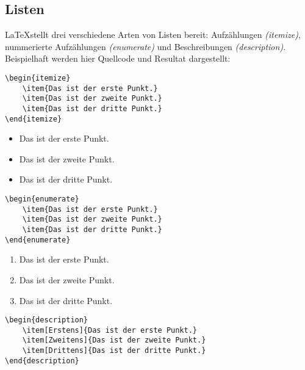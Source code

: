 \subsection{Listen}

\LaTeX stellt drei verschiedene Arten von Listen bereit: Aufzählungen \textit{(itemize)}, nummerierte Aufzählungen \textit{(enumerate)} und Beschreibungen \textit{(description)}.
Beispielhaft werden hier Quellcode und Resultat dargestellt:


\begin{verbatim}
\begin{itemize}
    \item{Das ist der erste Punkt.}
    \item{Das ist der zweite Punkt.}
    \item{Das ist der dritte Punkt.}
\end{itemize}
\end{verbatim}

\begin{itemize}
    \item{Das ist der erste Punkt.}
    \item{Das ist der zweite Punkt.}
    \item{Das ist der dritte Punkt.}
\end{itemize}


\begin{verbatim}
\begin{enumerate}
    \item{Das ist der erste Punkt.}
    \item{Das ist der zweite Punkt.}
    \item{Das ist der dritte Punkt.}
\end{enumerate}
\end{verbatim}

\begin{enumerate}
    \item{Das ist der erste Punkt.}
    \item{Das ist der zweite Punkt.}
    \item{Das ist der dritte Punkt.}
\end{enumerate}


\begin{verbatim}
\begin{description}
    \item[Erstens]{Das ist der erste Punkt.}
    \item[Zweitens]{Das ist der zweite Punkt.}
    \item[Drittens]{Das ist der dritte Punkt.}
\end{description}
\end{verbatim}


